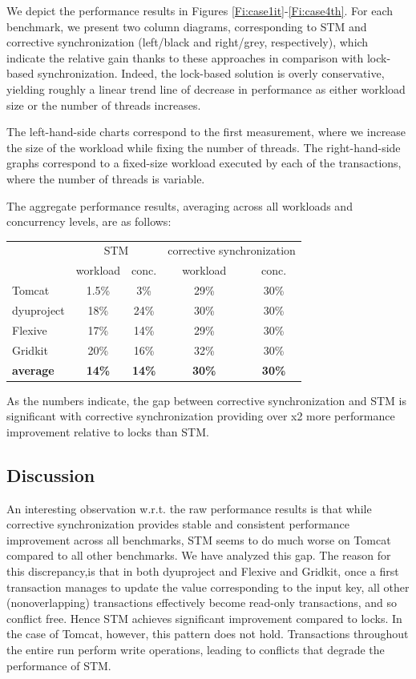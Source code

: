 We depict the performance results in Figures \ref{Fi:case1it}-\ref{Fi:case4th}. 
For each benchmark, we present two column diagrams, corresponding to STM and corrective synchronization (left/black and right/grey, respectively), which indicate the relative gain thanks to these approaches in comparison with lock-based synchronization. Indeed, the lock-based solution is overly conservative, yielding roughly a linear trend line of decrease in performance as either workload size or the number of threads increases.

The left-hand-side charts correspond to the first measurement, where we increase the size of the workload while fixing the number of threads. The right-hand-side graphs correspond to a fixed-size workload executed by each of the transactions, where the number of threads is variable.

The aggregate performance results, averaging across all workloads and concurrency levels, are as follows:
\begin{center}
	\footnotesize
\begin{tabular}{l|c|c|c|c}
					& \multicolumn{2}{c|}{STM} & \multicolumn{2}{c}{corrective synchronization} \\
					\cline{2-5} 
					& workload & conc. & workload & conc. \\
\hline
Tomcat	  	 &	1.5\%		&	3\% & 29\%		& 30\% \\			   
dyuproject	 & 	18\%		& 	24\%	    & 30\% &	30\%	\\
Flexive 		&	17\%	  &		14\%			& 29\% & 30\%	\\ 
Gridkit 		&	20\% 	&		16\%		& 32\% & 30\%	\\
\hline\hline	
{\bf average} & {\bf 14\%} 	&   {\bf 14\%}    & {\bf 30\%}   & {\bf 30\%} \\
\end{tabular}
\end{center}
As the numbers indicate, the gap between corrective synchronization and STM is significant with corrective synchronization providing over x2 more performance improvement relative to locks than STM.

\subsection{Discussion}

An interesting observation w.r.t. the raw performance results is that while corrective synchronization provides stable and consistent performance improvement across all benchmarks, STM seems to do much worse on Tomcat compared to all other benchmarks. We have analyzed this gap.
%
The reason for this discrepancy,is that in both dyuproject and Flexive and Gridkit, once a first transaction manages to update the value corresponding to the input key, all other (nonoverlapping) transactions effectively become read-only transactions, and so conflict free. Hence STM achieves significant improvement compared to locks. In the case of Tomcat, however, this pattern does not hold. Transactions throughout the entire run perform write operations, leading to conflicts that degrade the performance of STM.

